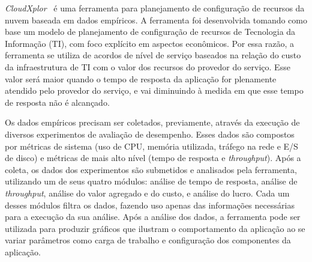 {\em CloudXplor}~\cite{malkowski2010cloudxplor} é uma ferramenta para
planejamento de configuração de recursos da nuvem baseada em dados empíricos. A ferramenta
foi desenvolvida tomando como base um modelo de planejamento de configuração de
recursos de Tecnologia da Informação (TI), com foco explícito em aspectos econômicos.
Por essa razão, a ferramenta se utiliza de acordos de nível de serviço baseados na relação do custo
da infraestrutura de TI com o valor dos recursos do provedor do serviço. Esse
valor será maior quando o tempo de resposta da aplicação for plenamente atendido
pelo provedor do serviço, e vai diminuindo à medida em que esse tempo de resposta
não é alcançado.

Os dados empíricos precisam ser coletados, previamente, através da execução de diversos experimentos de avaliação de desempenho. Esses dados
são compostos por métricas de sistema (uso de CPU, memória utilizada, tráfego na rede e E/S de disco) e métricas de mais alto nível (tempo de resposta e \textit{throughput}). Após a coleta, os dados dos experimentos são submetidos e analisados pela ferramenta, utilizando um de seus quatro módulos: análise de tempo de
resposta, análise de \textit{throughput}, análise do valor agregado e do custo,
e análise do lucro. Cada um desses módulos filtra os dados, fazendo uso apenas
das informações necessárias para a execução da sua análise. Após a análise dos
 dados, a ferramenta pode ser utilizada para produzir gráficos que ilustram o comportamento da aplicação ao se variar
parâmetros como carga de trabalho e configuração dos componentes da aplicação.




